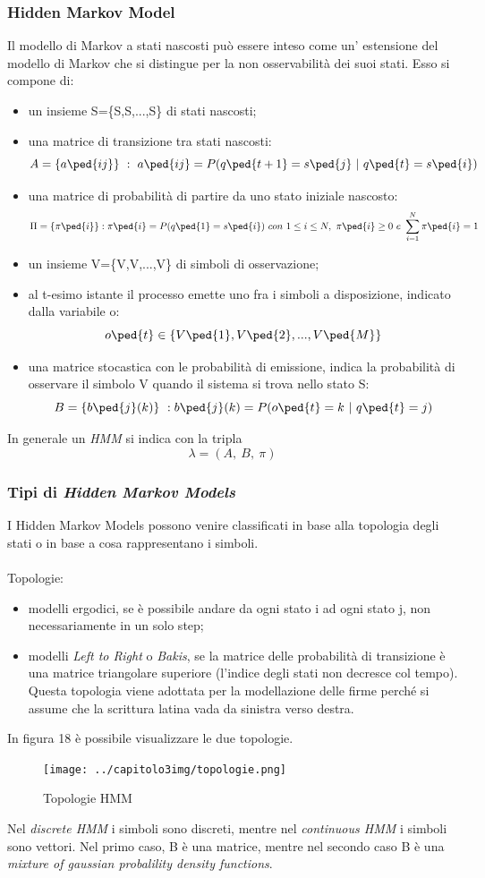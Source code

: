 \subsubsection*{Hidden Markov Model}
\label{3.3.2.3}
Il modello di Markov a stati nascosti può essere inteso come un' estensione del modello di Markov che si distingue per la non osservabilità dei suoi stati. Esso si compone di:
\begin{itemize}
\item un insieme S=\{S,S,...,S\} di stati nascosti;
\item una matrice di transizione tra stati nascosti:
\[ A=\{a\ped{ij}\}\ :\ a\ped{ij}=P(q\ped{t+1}=s\ped{j}\ |\ q\ped{t}=s\ped{i})\]
\item una matrice di probabilità di partire da uno stato iniziale nascosto:
\[ \Pi =\{\pi\ped{i}\}: \pi\ped{i}=P(q\ped{1} = s\ped{i})\ con\ 1\le i\le N,\  \pi\ped{i}\ge 0\  e\  \sum\limits_{i=1}^N \pi\ped{i} = 1 \]
\item un insieme V=\{V,V,...,V\} di simboli di osservazione;
\item al t-esimo istante il processo emette uno fra i simboli a disposizione, indicato dalla variabile o:
\[o\ped{t} \in\{V\ped{1},V\ped{2},...,V\ped{M}\}\]
\item una matrice stocastica con le probabilità di emissione, indica la probabilità di osservare il simbolo V quando il sistema si trova nello stato S:
\[ B=\{b\ped{j}(k)\}\ : b\ped{j}(k)=P(o\ped{t}=k\ |\ q\ped{t}=j)\]
\end{itemize}
In generale un \emph{HMM} si indica con la tripla
\[ \lambda=(A,\ B,\ \pi)\]
\subsubsection*{Tipi di \emph{Hidden Markov Models}}
\label{3.3.2.4}
I Hidden Markov Models possono venire classificati in base alla topologia degli stati o in base a cosa rappresentano i simboli.\\\\
Topologie:
\begin{itemize}
\item modelli ergodici, se è possibile andare da ogni stato i ad ogni stato j, non necessariamente in un solo step;
\item modelli \emph{Left to Right} o \emph{Bakis}, se la matrice delle probabilità di transizione è una matrice triangolare superiore (l'indice degli stati non decresce col tempo). Questa topologia viene adottata per la modellazione delle firme perché si assume che la scrittura latina vada da sinistra verso destra.
\end{itemize}
In figura 18 è possibile visualizzare le due topologie.
\begin{figure}[H]
\centering
\texttt{[image: ../capitolo3img/topologie.png]}
\caption{Topologie HMM}
\end{figure}
Nel \emph{discrete HMM} i simboli sono discreti, mentre nel \emph{continuous HMM} i simboli sono vettori. Nel primo caso, B è una matrice, mentre nel secondo caso B è una \emph{mixture of gaussian probalility density functions}.

